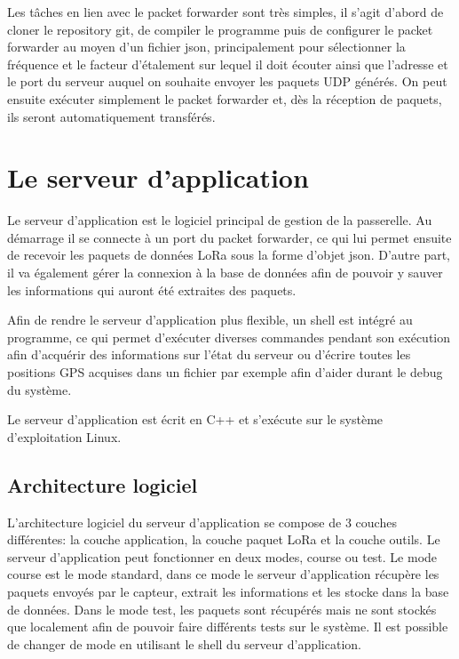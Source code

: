 Les tâches en lien avec le packet forwarder sont très simples, il s'agit d'abord de cloner le repository git, de compiler le programme puis de configurer le packet forwarder au moyen d'un fichier json, principalement pour sélectionner la fréquence et le facteur d'étalement sur lequel il doit écouter ainsi que l'adresse et le port du serveur auquel on souhaite envoyer les paquets UDP générés. On peut ensuite exécuter simplement le packet forwarder et, dès la réception de paquets, ils seront automatiquement transférés.

\section{Le serveur d'application}

Le serveur d'application est le logiciel principal de gestion de la passerelle. Au démarrage il se connecte à un port du packet forwarder, ce qui lui permet ensuite de recevoir les paquets de données LoRa sous la forme d'objet json. D'autre part, il va également gérer la connexion à la base de données afin de pouvoir y sauver les informations qui auront été extraites des paquets.

Afin de rendre le serveur d'application plus flexible, un shell est intégré au programme, ce qui permet d'exécuter diverses commandes pendant son exécution afin d'acquérir des informations sur l'état du serveur ou d'écrire toutes les positions GPS acquises dans un fichier par exemple afin d'aider durant le debug du système.

Le serveur d'application est écrit en C++ et s'exécute sur le système d'exploitation Linux.

\subsection{Architecture logiciel}

L'architecture logiciel du serveur d'application se compose de 3 couches différentes: la couche application, la couche paquet LoRa et la couche outils. Le serveur d'application peut fonctionner en deux modes, course ou test. Le mode course est le mode standard, dans ce mode le serveur d'application récupère les paquets envoyés par le capteur, extrait les informations et les stocke dans la base de données. Dans le mode test, les paquets sont récupérés mais ne sont stockés que localement afin de pouvoir faire différents tests sur le système. Il est possible de changer de mode en utilisant le shell du serveur d'application.

